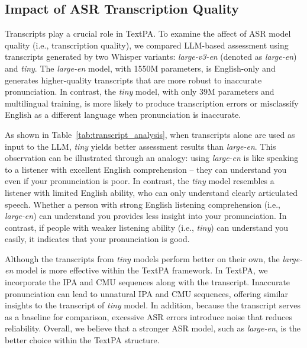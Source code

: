 \documentclass[11pt]{article}
\begin{document}
\subsection{Impact of ASR Transcription Quality}

Transcripts play a crucial role in TextPA. To examine the affect of ASR model quality (i.e., transcription quality), we compared LLM-based assessment using transcripts generated by two Whisper variants: \textit{large-v3-en} (denoted as \textit{large-en}) and \textit{tiny}. The \textit{large-en} model, with 1550M parameters, is English-only and generates higher-quality transcripts that are more robust to inaccurate pronunciation. In contrast, the \textit{tiny} model, with only 39M parameters and multilingual training, is more likely to produce transcription errors or misclassify English as a different language when pronunciation is inaccurate. 

As shown in Table~\ref{tab:transcript_analysis}, when transcripts alone are used as input to the LLM, \textit{tiny} yields better assessment results than \textit{large-en}. This observation can be illustrated through an analogy: using \textit{large-en} is like speaking to a listener with excellent English comprehension -- they can understand you even if your pronunciation is poor. In contrast, the \textit{tiny} model resembles a listener with limited English ability, who can only understand clearly articulated speech. Whether a person with strong English listening comprehension (i.e., \textit{large-en}) can understand you provides less insight into your pronunciation. In contrast, if people with weaker listening ability (i.e., \textit{tiny}) can understand you easily, it indicates that your pronunciation is good.

Although the transcripts from \textit{tiny} models perform better on their own, the \textit{large-en} model is more effective within the TextPA framework. In TextPA, we incorporate the IPA and CMU sequences along with the transcript. Inaccurate pronunciation can lead to unnatural IPA and CMU sequences, offering similar insights to the transcript of \textit{tiny} model. In addition, because the transcript serves as a baseline for comparison, excessive ASR errors introduce noise that reduces reliability. Overall, we believe that a stronger ASR model, such as \textit{large-en}, is the better choice within the TextPA structure.
\end{document}
